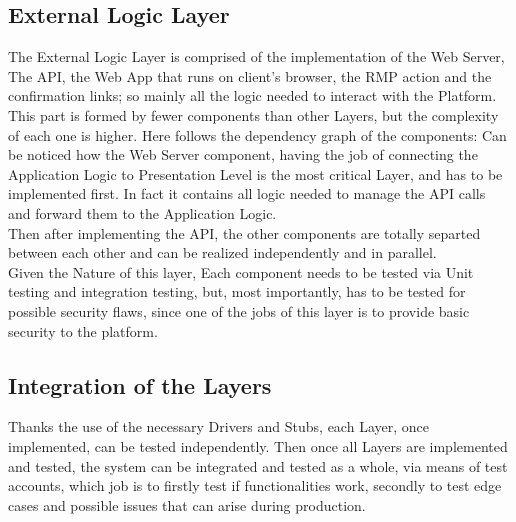 \subsection{External Logic Layer}
The External Logic Layer is comprised of the implementation of the Web Server, The API, the Web App that runs on client's browser, the RMP action and the confirmation links; so mainly all the logic needed to interact with the Platform.\\
This part is formed by fewer components than other Layers, but the complexity of each one is higher. Here follows the dependency graph of the components:
Can be noticed how the Web Server component, having the job of connecting the Application Logic to Presentation Level is the most critical Layer, and has to be implemented first. In fact it contains all logic needed to manage the API calls and forward them to the Application Logic.\\
Then after implementing the API, the other components are totally separted between each other and can be realized independently and in parallel.\\   
Given the Nature of this layer, Each component needs to be tested via Unit testing and integration testing, but, most importantly, has to be tested for possible security flaws, since one of the jobs of this layer is to provide basic security to the platform. \\

\subsection{Integration of the Layers}
Thanks the use of the necessary Drivers and Stubs, each Layer, once implemented, can be tested independently. 
Then once all Layers are implemented and tested, the system can be integrated and tested as a whole, via means of test accounts, which job is to firstly test if functionalities work, secondly to test edge cases and possible issues that can arise during production.\\